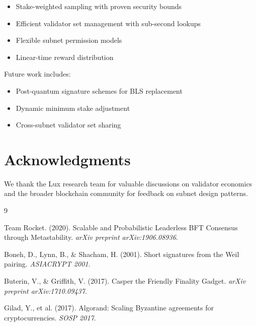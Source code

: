 \documentclass[11pt,letterpaper]{article}
\begin{document}
\begin{itemize}
    \item Stake-weighted sampling with proven security bounds
    \item Efficient validator set management with sub-second lookups
    \item Flexible subnet permission models
    \item Linear-time reward distribution
\end{itemize}

Future work includes:
\begin{itemize}
    \item Post-quantum signature schemes for BLS replacement
    \item Dynamic minimum stake adjustment
    \item Cross-subnet validator set sharing
\end{itemize}

\section*{Acknowledgments}

We thank the Lux research team for valuable discussions on validator economics and the broader blockchain community for feedback on subnet design patterns.


\begin{thebibliography}{9}

Team Rocket. (2020). Scalable and Probabilistic Leaderless BFT Consensus through Metastability. \textit{arXiv preprint arXiv:1906.08936}.

Boneh, D., Lynn, B., \& Shacham, H. (2001). Short signatures from the Weil pairing. \textit{ASIACRYPT 2001}.

Buterin, V., \& Griffith, V. (2017). Casper the Friendly Finality Gadget. \textit{arXiv preprint arXiv:1710.09437}.

Gilad, Y., et al. (2017). Algorand: Scaling Byzantine agreements for cryptocurrencies. \textit{SOSP 2017}.

\end{thebibliography}
\end{document}
